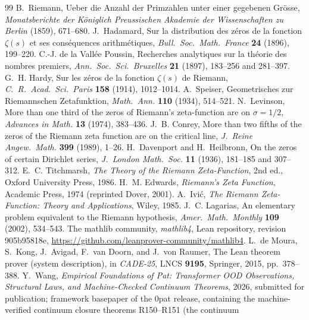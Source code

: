 \documentclass{article}
\renewcommand{\_}{\underscoreOrig\allowbreak}
\begin{document}
\begin{thebibliography}{99}
B.~Riemann, Ueber die Anzahl der Primzahlen unter einer gegebenen
Gr\"osse, \emph{Monatsberichte der K\"oniglich Preussischen Akademie
der Wissenschaften zu Berlin} (1859), 671--680.
J.~Hadamard, Sur la distribution des z\'eros de la fonction
$\zeta(s)$ et ses cons\'equences arithm\'etiques, \emph{Bull.\ Soc.\
Math.\ France} \textbf{24} (1896), 199--220.
C.-J. de la Vall\'ee Poussin, Recherches analytiques sur la th\'eorie
des nombres premiers, \emph{Ann.\ Soc.\ Sci.\ Bruxelles} \textbf{21}
(1897), 183--256 and 281--397.
G.~H. Hardy, Sur les z\'eros de la fonction $\zeta(s)$ de Riemann,
\emph{C.\ R.\ Acad.\ Sci.\ Paris} \textbf{158} (1914), 1012--1014.
\bibitem{speiser}
A.~Speiser, Geometrisches zur Riemannschen Zetafunktion,
\emph{Math.\ Ann.} \textbf{110} (1934), 514--521.
N.~Levinson, More than one third of the zeros of Riemann's
zeta-function are on $\sigma=1/2$, \emph{Advances in Math.}
\textbf{13} (1974), 383--436.
J.~B. Conrey, More than two fifths of the zeros of the Riemann zeta
function are on the critical line, \emph{J.\ Reine Angew.\ Math.}
\textbf{399} (1989), 1--26.
H.~Davenport and H.~Heilbronn, On the zeros of certain Dirichlet
series, \emph{J.\ London Math.\ Soc.} \textbf{11} (1936), 181--185
and 307--312.
E.~C. Titchmarsh, \emph{The Theory of the Riemann Zeta-Function},
2nd ed., Oxford University Press, 1986.
H.~M. Edwards, \emph{Riemann's Zeta Function}, Academic Press, 1974
(reprinted Dover, 2001).
A.~Ivi\'c, \emph{The Riemann Zeta-Function: Theory and Applications},
Wiley, 1985.
J.~C. Lagarias, An elementary problem equivalent to the Riemann
hypothesis, \emph{Amer.\ Math.\ Monthly} \textbf{109} (2002), 534--543.
\bibitem{mathlib}
The mathlib community, \emph{mathlib4}, Lean repository,
revision 905b95818e, \url{https://github.com/leanprover-community/mathlib4}.
\bibitem{lean}
L.~de Moura, S.~Kong, J.~Avigad, F.~van Doorn, and J.~von Raumer,
The Lean theorem prover (system description), in \emph{CADE-25},
LNCS \textbf{9195}, Springer, 2015, pp.~378--388.
Y.~Wang, \emph{Empirical Foundations of Pat: Transformer OOD Observations,
Structural Laws, and Machine-Checked Continuum Theorems}, 2026, submitted
for publication; framework basepaper of the 0pat release, containing the
machine-verified continuum closure theorems R150--R151 (the continuum

\end{thebibliography}
\end{document}
